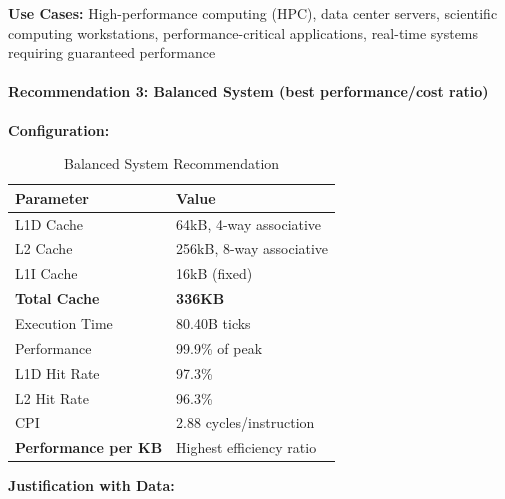 \documentclass[11pt,a4paper]{article}
\begin{document}
\textbf{Use Cases:} High-performance computing (HPC), data center servers, scientific computing workstations, performance-critical applications, real-time systems requiring guaranteed performance

\paragraph{Recommendation 3: Balanced System (best performance/cost ratio)}

\textbf{Configuration:}

\begin{table}[H]
\centering
\caption{Balanced System Recommendation}
\begin{tabular}{ll}
\toprule
\textbf{Parameter} & \textbf{Value} \\
\midrule
L1D Cache & 64kB, 4-way associative \\
L2 Cache & 256kB, 8-way associative \\
L1I Cache & 16kB (fixed) \\
\textbf{Total Cache} & \textbf{336KB} \\
\midrule
Execution Time & 80.40B ticks \\
Performance & 99.9\% of peak \\
L1D Hit Rate & 97.3\% \\
L2 Hit Rate & 96.3\% \\
CPI & 2.88 cycles/instruction \\
\textbf{Performance per KB} & Highest efficiency ratio \\
\bottomrule
\end{tabular}
\end{table}

\textbf{Justification with Data:}
\end{document}
